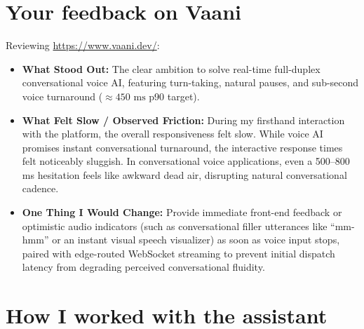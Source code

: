 \documentclass[9pt,a4paper]{article}
\begin{document}
\section*{Your feedback on Vaani}
Reviewing \url{https://www.vaani.dev/}:
\begin{itemize}
    \item \textbf{What Stood Out:} The clear ambition to solve real-time full-duplex conversational voice AI, featuring turn-taking, natural pauses, and sub-second voice turnaround ($\approx 450\text{ ms}$ p90 target).
    \item \textbf{What Felt Slow / Observed Friction:} During my firsthand interaction with the platform, the overall responsiveness felt slow. While voice AI promises instant conversational turnaround, the interactive response times felt noticeably sluggish. In conversational voice applications, even a 500--800 ms hesitation feels like awkward dead air, disrupting natural conversational cadence.
    \item \textbf{One Thing I Would Change:} Provide immediate front-end feedback or optimistic audio indicators (such as conversational filler utterances like ``mm-hmm'' or an instant visual speech visualizer) as soon as voice input stops, paired with edge-routed WebSocket streaming to prevent initial dispatch latency from degrading perceived conversational fluidity.
\end{itemize}

\newpage

\section*{How I worked with the assistant}
\end{document}
